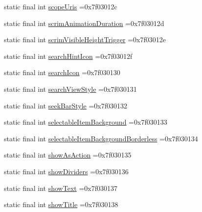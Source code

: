 \begin{DoxyCompactItemize}
\item 
static final int \mbox{\hyperlink{classbr_1_1unb_1_1cic_1_1mp_1_1marketmaster_1_1R_1_1attr_a4c9a02aeb54e873d6ddb8a4a0d68258d}{scope\+Uris}} =0x7f03012c
\item 
static final int \mbox{\hyperlink{classbr_1_1unb_1_1cic_1_1mp_1_1marketmaster_1_1R_1_1attr_a2631ff803960aae95e1bf0c901e0995d}{scrim\+Animation\+Duration}} =0x7f03012d
\item 
static final int \mbox{\hyperlink{classbr_1_1unb_1_1cic_1_1mp_1_1marketmaster_1_1R_1_1attr_abd1891aabd4ebbcc2cbd3f02b8f05c8d}{scrim\+Visible\+Height\+Trigger}} =0x7f03012e
\item 
static final int \mbox{\hyperlink{classbr_1_1unb_1_1cic_1_1mp_1_1marketmaster_1_1R_1_1attr_a0f3bca7a5216cf1c622ae88a67c059db}{search\+Hint\+Icon}} =0x7f03012f
\item 
static final int \mbox{\hyperlink{classbr_1_1unb_1_1cic_1_1mp_1_1marketmaster_1_1R_1_1attr_aafb37d839baeada6d26920e282df1154}{search\+Icon}} =0x7f030130
\item 
static final int \mbox{\hyperlink{classbr_1_1unb_1_1cic_1_1mp_1_1marketmaster_1_1R_1_1attr_afbd3f1d596d4deccc33df2e0e71f5a81}{search\+View\+Style}} =0x7f030131
\item 
static final int \mbox{\hyperlink{classbr_1_1unb_1_1cic_1_1mp_1_1marketmaster_1_1R_1_1attr_a90eca81d327d1a7d78da7ac71ad4be6e}{seek\+Bar\+Style}} =0x7f030132
\item 
static final int \mbox{\hyperlink{classbr_1_1unb_1_1cic_1_1mp_1_1marketmaster_1_1R_1_1attr_ae64f06338522e70a301ef33bbcd7e6d2}{selectable\+Item\+Background}} =0x7f030133
\item 
static final int \mbox{\hyperlink{classbr_1_1unb_1_1cic_1_1mp_1_1marketmaster_1_1R_1_1attr_a8aaba2bcb92d8d7e4a6a1f6c63561713}{selectable\+Item\+Background\+Borderless}} =0x7f030134
\item 
static final int \mbox{\hyperlink{classbr_1_1unb_1_1cic_1_1mp_1_1marketmaster_1_1R_1_1attr_af08e2b9b1d877cab1e0684dd5d9ee11f}{show\+As\+Action}} =0x7f030135
\item 
static final int \mbox{\hyperlink{classbr_1_1unb_1_1cic_1_1mp_1_1marketmaster_1_1R_1_1attr_a16f038586266f3505d334ad262bb3c91}{show\+Dividers}} =0x7f030136
\item 
static final int \mbox{\hyperlink{classbr_1_1unb_1_1cic_1_1mp_1_1marketmaster_1_1R_1_1attr_a5d68a184063639c38d569524a3ce66ef}{show\+Text}} =0x7f030137
\item 
static final int \mbox{\hyperlink{classbr_1_1unb_1_1cic_1_1mp_1_1marketmaster_1_1R_1_1attr_a1896954f6788b6e7853e9abe3de23c2a}{show\+Title}} =0x7f030138

\end{DoxyCompactItemize}
